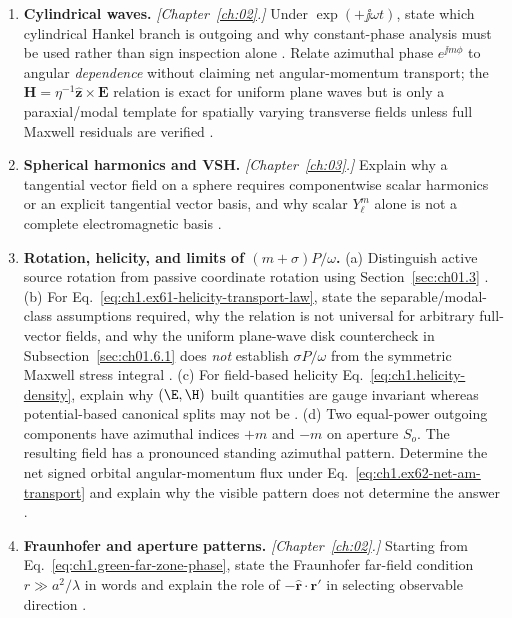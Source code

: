 \begin{enumerate}
\item \textbf{Cylindrical waves.}
\emph{[Chapter~\ref{ch:02}.]} Under $\exp(+\jj\omega t)$, state which cylindrical Hankel branch is outgoing and why constant-phase analysis must be used rather than sign inspection alone \cite{stratton1941,harrington2001}. Relate azimuthal phase $e^{\jj m\phi}$ to angular \emph{dependence} without claiming net angular-momentum transport; the $\mathbf{H}=\eta^{-1}\hat{\mathbf{z}}\times\mathbf{E}$ relation is exact for uniform plane waves but is only a paraxial/modal template for spatially varying transverse fields unless full Maxwell residuals are verified \cite{beth1936,allen1992}.

\item \textbf{Spherical harmonics and VSH.}
\emph{[Chapter~\ref{ch:03}.]} Explain why a tangential vector field on a sphere requires componentwise scalar harmonics or an explicit tangential vector basis, and why scalar $Y_\ell^m$ alone is not a complete electromagnetic basis \cite{stratton1941,hansen1988}.

\item \textbf{Rotation, helicity, and limits of $(m+\sigma)P/\omega$.}
(a) Distinguish active source rotation from passive coordinate rotation using Section~\ref{sec:ch01.3} \cite{beth1936,stratton1941}.
(b) For Eq.~\eqref{eq:ch1.ex61-helicity-transport-law}, state the separable/modal-class assumptions required, why the relation is not universal for arbitrary full-vector fields, and why the uniform plane-wave disk countercheck in Subsection~\ref{sec:ch01.6.1} does \emph{not} establish $\sigma P/\omega$ from the symmetric Maxwell stress integral \cite{stratton1941,allen1992}.
(c) For field-based helicity Eq.~\eqref{eq:ch1.helicity-density}, explain why $(\E,\H)$ built quantities are gauge invariant whereas potential-based canonical splits may not be \cite{jackson1999,belinfante1940}.
(d) Two equal-power outgoing components have azimuthal indices $+m$ and $-m$ on aperture $S_o$. The resulting field has a pronounced standing azimuthal pattern. Determine the net signed orbital angular-momentum flux under Eq.~\eqref{eq:ch1.ex62-net-am-transport} and explain why the visible pattern does not determine the answer \cite{allen1992,beth1936}.

\item \textbf{Fraunhofer and aperture patterns.}
\emph{[Chapter~\ref{ch:02}.]} Starting from Eq.~\eqref{eq:ch1.green-far-zone-phase}, state the Fraunhofer far-field condition $r\gg a^2/\lambda$ in words and explain the role of $-\hat{\mathbf{r}}\cdot\mathbf{r}'$ in selecting observable direction \cite{bornwolf1999,silver1949}.


\end{enumerate}
